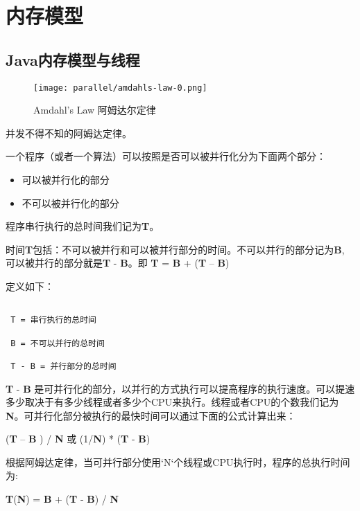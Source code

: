 \chapter{内存模型}
\label{chap:memory}

\section{Java内存模型与线程}
 
\begin{figure}[H]
    \centering
    \texttt{[image: parallel/amdahls-law-0.png]}
    \caption{Amdahl's Law 阿姆达尔定律}
\end{figure}

并发不得不知的阿姆达定律。

一个程序（或者一个算法）可以按照是否可以被并行化分为下面两个部分：

\begin{itemize}
    \item 可以被并行化的部分
    \item 不可以被并行化的部分 
\end{itemize}


程序串行执行的总时间我们记为\textbf{T}。

时间\textbf{T}包括：不可以被并行和可以被并行部分的时间。不可以并行的部分记为\textbf{B}, 可以被并行的部分就是\textbf{T} - \textbf{B}。即 \textbf{T} = \textbf{B} + (\textbf{T} – \textbf{B}) 

定义如下：

\begin{lstlisting}

 T = 串行执行的总时间

 B = 不可以并行的总时间

 T - B = 并行部分的总时间

\end{lstlisting}


\textbf{T} - \textbf{B} 是可并行化的部分，以并行的方式执行可以提高程序的执行速度。可以提速多少取决于有多少线程或者多少个CPU来执行。线程或者CPU的个数我们记为\textbf{N}。可并行化部分被执行的最快时间可以通过下面的公式计算出来：

(\textbf{T} – \textbf{B} ) / \textbf{N} 或 (1/\textbf{N}) * (\textbf{T} - \textbf{B})

根据阿姆达定律，当可并行部分使用`N`个线程或CPU执行时，程序的总执行时间为:

\textbf{T}(\textbf{N}) = \textbf{B} + (\textbf{T} - \textbf{B}) / \textbf{N}

